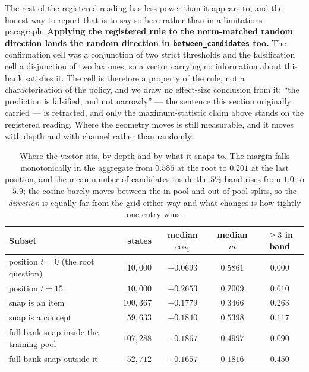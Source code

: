 \documentclass[11pt]{article}
\begin{document}
The rest of the registered reading has less power than it appears to, and the honest way to report
that is to say so here rather than in a limitations paragraph. \textbf{Applying the registered rule
to the norm-matched random direction lands the random direction in \texttt{between\_candidates} too.}
The confirmation cell was a conjunction of two strict thresholds and the falsification cell a
disjunction of two lax ones, so a vector carrying no information about this bank satisfies it. The
cell is therefore a property of the rule, not a characterisation of the policy, and we draw no
effect-size conclusion from it: ``the prediction is falsified, and not narrowly'' --- the sentence
this section originally carried --- is retracted, and only the maximum-statistic claim above stands
on the registered reading. Where the geometry moves is still measurable, and it moves with depth and
with channel rather than randomly.

\begin{table}[h]
\centering\small
\begin{tabular}{@{}lrccc@{}}
\toprule
\textbf{Subset} & \textbf{states} & \textbf{median $\cos_1$} & \textbf{median $m$} &
\textbf{$\ge 3$ in band} \\
\midrule
position $t=0$ (the root question) & $10{,}000$ & $-0.0693$ & $0.5861$ & $0.000$ \\
position $t=15$ & $10{,}000$ & $-0.2653$ & $\mathbf{0.2009}$ & $\mathbf{0.610}$ \\
\midrule
snap is an item & $100{,}367$ & $-0.1779$ & $0.3466$ & $0.263$ \\
snap is a concept & $59{,}633$ & $-0.1840$ & $0.5398$ & $0.117$ \\
\midrule
full-bank snap inside the training pool & $107{,}288$ & $-0.1867$ & $0.4997$ & $0.090$ \\
full-bank snap outside it & $52{,}712$ & $-0.1657$ & $\mathbf{0.1816}$ & $\mathbf{0.450}$ \\
\bottomrule
\end{tabular}
\caption{Where the vector sits, by depth and by what it snaps to. The margin falls monotonically in
the aggregate from $0.586$ at the root to $0.201$ at the last position, and the mean number of
candidates inside the $5\%$ band rises from $1.0$ to $5.9$; the cosine barely moves between the
in-pool and out-of-pool splits, so the \emph{direction} is equally far from the grid either way and
what changes is how tightly one entry wins.}
\label{tab:c0splits}
\end{table}
\end{document}
